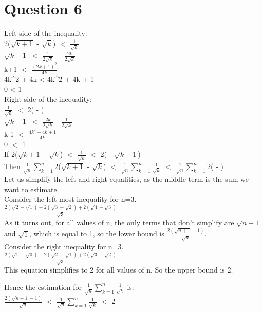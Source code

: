 \documentclass{beamer}     %
\begin{document}
\section*{Question 6}
Left side of the inequality: \\
2($\sqrt{k+1}$ - $\sqrt{k}$) $<$ $\frac{1}{\sqrt{k}}$\\
$\sqrt{k+1}$ $<$ $\frac{1}{2\sqrt{k}}$ + $\frac{2k}{2\sqrt{k}}$\\
k+1 $<$ $\frac{(2k+1)^2}{4k}$\\
4k^2 + 4k < 4k^2 + 4k + 1\\
0 < 1\\

Right side of the inequality: \\
$\frac{1}{\sqrt{k}}$ $<$ 2( - )\\
$\sqrt{k-1}$ $<$ $\frac{2k}{2\sqrt{k}}$ - $\frac{1}{2\sqrt{k}}$\\
k-1 $<$ $\frac{4k^2 -4k + 1}{4k}$\\
0 $<$ 1\\

If 2($\sqrt{k+1}$ - $\sqrt{k}$) $<$ $\frac{1}{\sqrt{k}}$ $<$ 2( - $\sqrt{k-1}$)\\
Then $\frac{1}{\sqrt{n}}$$\sum_{k=1}^{n}$2($\sqrt{k+1}$ - $\sqrt{k}$) $<$ $\frac{1}{\sqrt{n}}$$\sum_{k=1}^{n}$$\frac{1}{\sqrt{k}}$ $<$ $\frac{1}{\sqrt{n}}$$\sum_{k=1}^{n}$2( - )\\

Let us simplify the left and right equalities, as the middle term is the sum we want to estimate. \\Consider the left most inequality for n=3. \\
$\frac{2(\sqrt{2} - \sqrt{1}) + 2(\sqrt{3} - \sqrt{2}) + 2(\sqrt{4} - \sqrt{3})}{\sqrt{3}}$\\
As it turns out, for all values of n, the only terms that don't simplify are $\sqrt{n+1}$ and $\sqrt{1}$, which is equal to 1, so the lower bound is $\frac{2(\sqrt{n+1}-1)}{\sqrt{n}}$.\\
Consider the right inequality for n=3.\\
$\frac{2(\sqrt{1} - \sqrt{0}) + 2(\sqrt{2} - \sqrt{1}) + 2(\sqrt{3} - \sqrt{2})}{\sqrt{3}}$\\
This equation simplifies to 2 for all values of n. So the upper bound is 2.

Hence the estimation for $\frac{1}{\sqrt{n}}$$\sum_{k=1}^{n}$$\frac{1}{\sqrt{k}}$ is:\\
$\frac{2(\sqrt{n+1}-1)}{\sqrt{n}}$ $<$ $\frac{1}{\sqrt{n}}$$\sum_{k=1}^{n}$$\frac{1}{\sqrt{k}}$ $<$ 2
\end{document}
